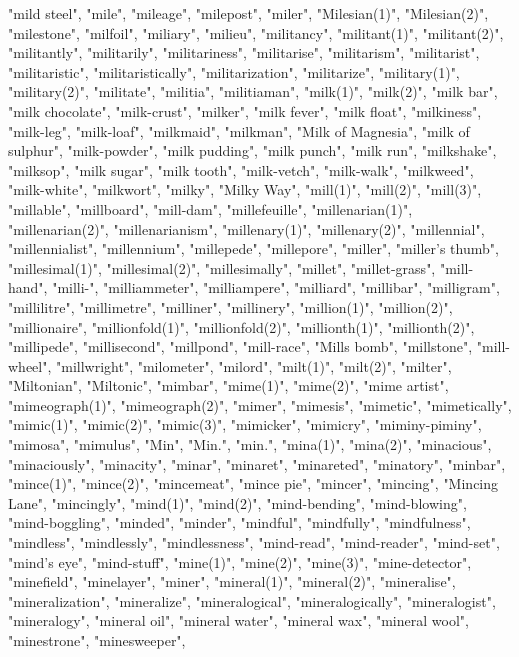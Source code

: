 "mild steel",
"mile",
"mileage",
"milepost",
"miler",
"Milesian(1)",
"Milesian(2)",
"milestone",
"milfoil",
"miliary",
"milieu",
"militancy",
"militant(1)",
"militant(2)",
"militantly",
"militarily",
"militariness",
"militarise",
"militarism",
"militarist",
"militaristic",
"militaristically",
"militarization",
"militarize",
"military(1)",
"military(2)",
"militate",
"militia",
"militiaman",
"milk(1)",
"milk(2)",
"milk bar",
"milk chocolate",
"milk-crust",
"milker",
"milk fever",
"milk float",
"milkiness",
"milk-leg",
"milk-loaf",
"milkmaid",
"milkman",
"Milk of Magnesia",
"milk of sulphur",
"milk-powder",
"milk pudding",
"milk punch",
"milk run",
"milkshake",
"milksop",
"milk sugar",
"milk tooth",
"milk-vetch",
"milk-walk",
"milkweed",
"milk-white",
"milkwort",
"milky",
"Milky Way",
"mill(1)",
"mill(2)",
"mill(3)",
"millable",
"millboard",
"mill-dam",
"millefeuille",
"millenarian(1)",
"millenarian(2)",
"millenarianism",
"millenary(1)",
"millenary(2)",
"millennial",
"millennialist",
"millennium",
"millepede",
"millepore",
"miller",
"miller's thumb",
"millesimal(1)",
"millesimal(2)",
"millesimally",
"millet",
"millet-grass",
"mill-hand",
"milli-",
"milliammeter",
"milliampere",
"milliard",
"millibar",
"milligram",
"millilitre",
"millimetre",
"milliner",
"millinery",
"million(1)",
"million(2)",
"millionaire",
"millionfold(1)",
"millionfold(2)",
"millionth(1)",
"millionth(2)",
"millipede",
"millisecond",
"millpond",
"mill-race",
"Mills bomb",
"millstone",
"mill-wheel",
"millwright",
"milometer",
"milord",
"milt(1)",
"milt(2)",
"milter",
"Miltonian",
"Miltonic",
"mimbar",
"mime(1)",
"mime(2)",
"mime artist",
"mimeograph(1)",
"mimeograph(2)",
"mimer",
"mimesis",
"mimetic",
"mimetically",
"mimic(1)",
"mimic(2)",
"mimic(3)",
"mimicker",
"mimicry",
"miminy-piminy",
"mimosa",
"mimulus",
"Min",
"Min.",
"min.",
"mina(1)",
"mina(2)",
"minacious",
"minaciously",
"minacity",
"minar",
"minaret",
"minareted",
"minatory",
"minbar",
"mince(1)",
"mince(2)",
"mincemeat",
"mince pie",
"mincer",
"mincing",
"Mincing Lane",
"mincingly",
"mind(1)",
"mind(2)",
"mind-bending",
"mind-blowing",
"mind-boggling",
"minded",
"minder",
"mindful",
"mindfully",
"mindfulness",
"mindless",
"mindlessly",
"mindlessness",
"mind-read",
"mind-reader",
"mind-set",
"mind's eye",
"mind-stuff",
"mine(1)",
"mine(2)",
"mine(3)",
"mine-detector",
"minefield",
"minelayer",
"miner",
"mineral(1)",
"mineral(2)",
"mineralise",
"mineralization",
"mineralize",
"mineralogical",
"mineralogically",
"mineralogist",
"mineralogy",
"mineral oil",
"mineral water",
"mineral wax",
"mineral wool",
"minestrone",
"minesweeper",
